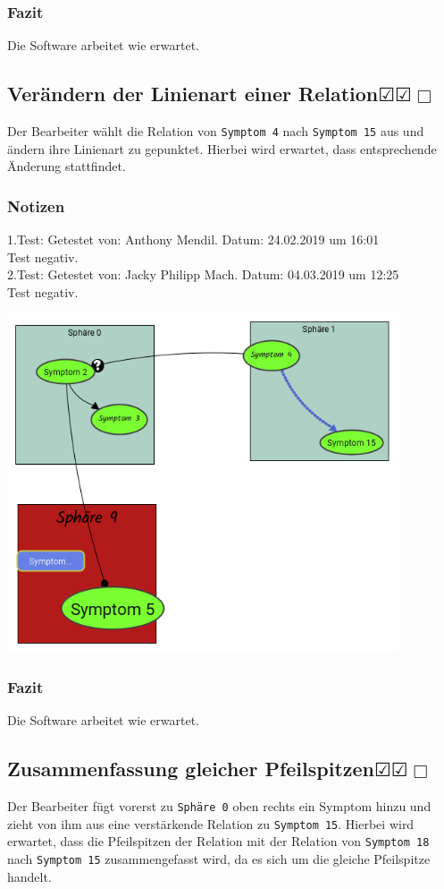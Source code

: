 \documentclass[enabledeprecatedfontcommands]{scrartcl}
\newcommand{\subsectiont}[2]{\subsection[#1]{#1{\normalsize\normalfont #2}}}
\newcommand{\leer}{$\Box$}
\newcommand{\ok}{$\CheckedBox$}
\begin{document}
\subsubsection{Fazit}
Die Software arbeitet wie erwartet.

\subsectiont{Verändern der Linienart einer Relation}{\dotfill\ok\ok\leer}
Der Bearbeiter wählt die Relation von \texttt{Symptom 4} nach \texttt{Symptom 15} aus und ändern ihre Linienart zu gepunktet. Hierbei wird erwartet, dass entsprechende Änderung stattfindet. 
\subsubsection{Notizen}
1.Test: Getestet von: Anthony Mendil. Datum: 24.02.2019 um 16:01 \\
Test negativ.\\
2.Test: Getestet von: Jacky Philipp Mach. Datum: 04.03.2019 um 12:25 \\
Test negativ.
\begin{center}
\includegraphics[height=10cm]{3_34.PNG}
\end{center}
\subsubsection{Fazit}
Die Software arbeitet wie erwartet.

\subsectiont{Zusammenfassung gleicher Pfeilspitzen}{\dotfill\ok\ok\leer}
Der Bearbeiter fügt vorerst zu \texttt{Sphäre 0} oben rechts ein Symptom hinzu und zieht von ihm aus eine verstärkende Relation zu \texttt{Symptom 15}. Hierbei wird erwartet, dass die Pfeilspitzen der Relation mit der Relation von \texttt{Symptom 18} nach \texttt{Symptom 15} zusammengefasst wird, da es sich um die gleiche Pfeilspitze handelt.
\end{document}
